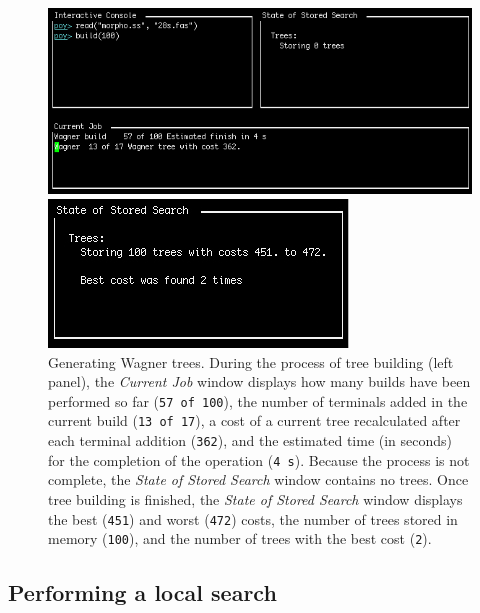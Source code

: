 \begin{figure}
\centering
\begin{minipage}[c]{0.507\textwidth}
   		\includegraphics[width=\textwidth]{figures/building1.jpg}
\end{minipage}
\quad
\begin{minipage}[c]{0.453\textwidth}
	   	\includegraphics[width=\textwidth]{figures/building2.jpg}
   	\end{minipage}
\caption{Generating Wagner trees. During the process of tree building (left panel), the \emph{Current Job} window displays how many builds have been performed so far (\texttt{57 of 100}), the number of terminals added in the current build (\texttt{13 of 17}), a cost of a current tree recalculated after each terminal addition (\texttt{362}), and the estimated time (in seconds) for the completion of the operation (\texttt{4 s}). Because the process is not complete, the \emph{State of Stored Search} window contains no trees. Once tree building is finished, the \emph{State of Stored Search} window displays the best (\texttt{451}) and worst (\texttt{472}) costs, the number of trees stored in memory (\texttt{100}), and the number of trees with the best cost (\texttt{2}).} 
\label{fig:building}
\end{figure}

\subsection{Performing a local search}

